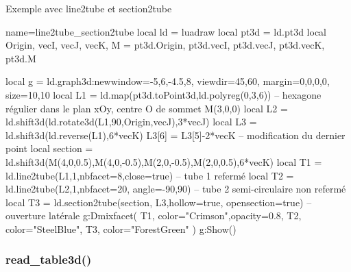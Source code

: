 \begin{demo}{Exemple avec line2tube et section2tube}
\begin{luadraw}{name=line2tube_section2tube}
local ld = luadraw
local pt3d = ld.pt3d
local Origin, vecI, vecJ, vecK, M = pt3d.Origin, pt3d.vecI, pt3d.vecJ, pt3d.vecK, pt3d.M

local g = ld.graph3d:new{window={-5,6,-4.5,8}, viewdir={45,60}, margin={0,0,0,0}, size={10,10}}
local L1 = ld.map(pt3d.toPoint3d,ld.polyreg(0,3,6)) -- hexagone régulier dans le plan xOy, centre O de sommet M(3,0,0)
local L2 = ld.shift3d(ld.rotate3d(L1,90,{Origin,vecJ}),3*vecJ)
local L3 = ld.shift3d(ld.reverse(L1),6*vecK)
L3[6] = L3[5]-2*vecK -- modification du dernier point
local section = ld.shift3d({M(4,0,0.5),M(4,0,-0.5),M(2,0,-0.5),M(2,0,0.5)},6*vecK)
local T1 = ld.line2tube(L1,1,{nbfacet=8,close=true}) -- tube 1 refermé
local T2 = ld.line2tube(L2,1,{nbfacet=20, angle={-90,90}}) -- tube 2 semi-circulaire non refermé
local T3 = ld.section2tube(section, L3,{hollow=true, opensection=true}) -- ouverture latérale
g:Dmixfacet( T1, {color="Crimson",opacity=0.8}, T2, {color="SteelBlue"}, T3, {color="ForestGreen"} )
g:Show()
\end{luadraw}
\end{demo}

\subsubsection{read\_table3d()}

